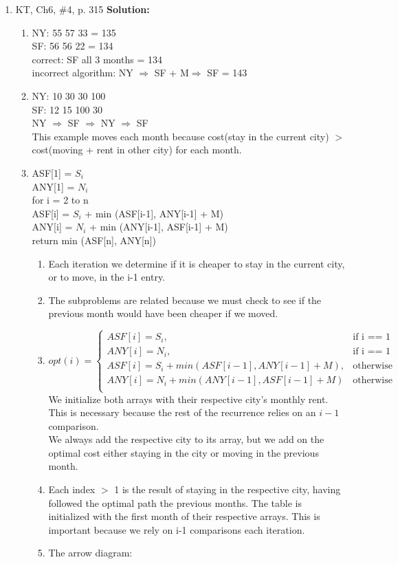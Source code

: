\documentclass[11pt]{article}
\begin{document}
\begin{enumerate}
\item
KT, Ch6, \#4, p. 315
\textbf{Solution:}\\
\begin{enumerate}
\item
NY:	55	57	33 = 135\\
SF: 56	56	22 = 134\\
correct: SF all 3 months = 134\\
incorrect algorithm: NY $\Rightarrow$ SF + M$\Rightarrow$ SF = 143
\item
NY:	10	30	30	100\\
SF:	12	15	100	30\\
NY $\Rightarrow$ SF $\Rightarrow$ NY $\Rightarrow$ SF\\
This example moves each month because cost(stay in the current city) $>$ cost(moving + rent in other city) for each month.
\newpage
\item
ASF[1] = $S_i$\\
ANY[1] = $N_i$\\
for i = 2 to n\\
\hspace*{1cm} ASF[i] = $S_i$ + min (ASF[i-1], ANY[i-1] + M)\\
\hspace*{1cm} ANY[i] = $N_i$ + min (ANY[i-1], ASF[i-1] + M)\\
return min (ASF[n], ANY[n])\\
\begin{enumerate}
\item
Each iteration we determine if it is cheaper to stay in the current city, or to move, in the i-1 entry.
\item
The subproblems are related because we must check to see if the previous month would have been cheaper if we moved.
\item
\begin{equation}
opt (i) =\begin{cases}
ASF[i] = S_i, & \text{if i == 1}\\
ANY[i] = N_i, & \text{if i == 1}\\
ASF[i] = S_i + min (ASF[i-1], ANY[i-1] + M), & \text{otherwise}\\
ANY[i] = N_i + min (ANY[i-1], ASF[i-1] + M) & \text{otherwise}\\
\end{cases}
\end{equation}
We initialize both arrays with their respective city's monthly rent. This is necessary because the rest of the recurrence relies on an $i-1$ comparison.\\
We always add the respective city to its array, but we add on the optimal cost either staying in the city or moving in the previous month.
\item
Each index $>$ 1 is the result of staying in the respective city, having followed the optimal path the previous months. The table is initialized with the first month of their respective arrays. This is important because we rely on i-1 comparisons each iteration.
\vspace*{3cm}
\item
The arrow diagram:
\vspace*{3cm}


\end{enumerate}
\end{enumerate}
\end{enumerate}
\end{document}
